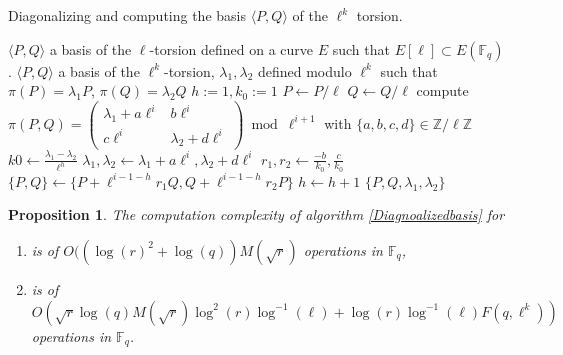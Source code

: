 \documentclass{lms}
\newtheorem{prop}[thm]{Proposition}
\begin{document}
\begin{algorithm}
\caption{\label{Diagnoalizedbasis}Diagonalizing and computing the basis $\langle P,Q \rangle $ of the $\ell^k$ torsion.}
\begin{algorithmic}[5]
\REQUIRE $\langle P,Q \rangle$ a basis of the $\ell$-torsion defined on a curve $E$ such that $E[\ell] \subset E(\mathbb{F}_q)$ .
\ENSURE $\langle P,Q \rangle$ a basis of the $\ell^k$-torsion, $\lambda_1, \lambda_2$ defined modulo $\ell^k$ such that $\pi(P)=\lambda_1P$, $ \pi(Q)=\lambda_2Q$
\STATE $h:=1, k_0:=1$
\STATE $P \leftarrow P/\ell$
\STATE $Q \leftarrow Q/\ell$ 
\STATE compute $\pi(P,Q)=\left( \begin{array}{cc}
\lambda_1 + a\ell^{i} & b\ell^{i}\\
c\ell^{i} & \lambda_2 + d\ell^{i}
\end{array} \right) \bmod \ell^{i+1}$ with $\{a,b,c,d\} \in \mathbb{Z}/\ell\mathbb{Z}$
\STATE $k0 \leftarrow \frac{\lambda_1-\lambda_2}{\ell^h}$
\ENDIF
\STATE $\lambda_1, \lambda_2  \gets \lambda_1 + a\ell^i, \lambda_2 + d\ell^i$
\STATE $r_1,r_2 \gets \frac{-b }{k_0}, \frac{c }{k_0}$  
\STATE $\{P,Q\} \gets \{P+\ell^{i-1-h}r_1Q,Q+\ell^{i-1-h}r_2P\}$
\STATE $h \leftarrow h+1$
\ENDIF
\ENDFOR
\RETURN $\{P,Q,\lambda_1,\lambda_2\}$
\end{algorithmic}
\end{algorithm}

\begin{prop}
The computation complexity of algorithm \ref{Diagnoalizedbasis} for 
\begin{enumerate}
\item[$\ell=2$] is of $O((\log(r)^2+\log(q)) M(\sqrt{r}) $ operations in $\mathbb{F}_q$, 
\item[$\ell \neq 2$] is of $O(\sqrt{r} \log(q) M(\sqrt{r})\log^2(r)\log^{-1}(\ell)+ \log(r)\log^{-1}(\ell) F(q,\ell^k))$ operations in $\mathbb{F}_q$.
\end{enumerate}
\end{prop}
\end{document}
